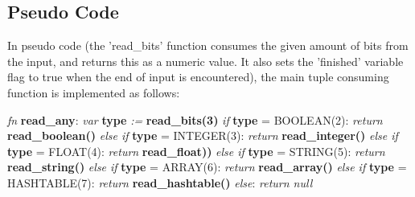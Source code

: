 \subsection{Pseudo Code}

In pseudo code (the 'read\_bits' function consumes the given amount of bits
from the input, and returns this as a numeric value. It also sets the
'finished' variable flag to true when the end of input is encountered),
the main tuple consuming function is implemented as follows:

\begin{changemargin}{-60mm}{0mm}
\begin{myquote}

\vbox{
\textit{fn} \textbf{read\_any}: \newline
\indent\hspace{.5cm} \textit{var} \textbf{type} \textit{:=} \textbf{read\_bits(3)} \newline
\indent\hspace{.5cm} \textit{if} \textbf{type} = BOOLEAN(2): \newline
\indent\hspace{1cm} \textit{return} \textbf{read\_boolean()} \newline
\indent\hspace{.5cm} \textit{else if} \textbf{type} = INTEGER(3): \newline
\indent\hspace{1cm} \textit{return} \textbf{read\_integer()} \newline
\indent\hspace{.5cm} \textit{else if} \textbf{type} = FLOAT(4): \newline
\indent\hspace{1cm} \textit{return} \textbf{read\_float))} \newline
\indent\hspace{.5cm} \textit{else if} \textbf{type} = STRING(5): \newline
\indent\hspace{1cm} \textit{return} \textbf{read\_string()} \newline
\indent\hspace{.5cm} \textit{else if} \textbf{type} = ARRAY(6): \newline
\indent\hspace{1cm} \textit{return} \textbf{read\_array()} \newline
\indent\hspace{.5cm} \textit{else if} \textbf{type} = HASHTABLE(7): \newline
\indent\hspace{1cm} \textit{return} \textbf{read\_hashtable()} \newline
\indent\hspace{.5cm} \textit{else}: \newline
\indent\hspace{1cm} \textit{return null} \newline
}

\end{myquote}
\end{changemargin}


